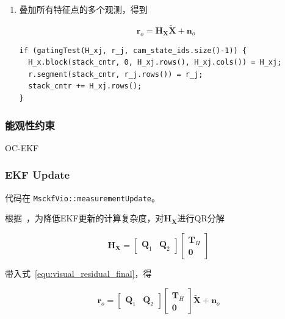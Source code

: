\documentclass[12pt,a4paper]{article}
\begin{document}
\begin{enumerate}
\item 叠加所有特征点的多个观测，得到

\begin{equation}
\label{equ:visual_residual_final}
\mathbf{r}_{o}=\mathbf{H}_{\mathbf{X}} \widetilde{\mathbf{X}}+\mathbf{n}_{o}
\end{equation}

\begin{lstlisting}
if (gatingTest(H_xj, r_j, cam_state_ids.size()-1)) {
  H_x.block(stack_cntr, 0, H_xj.rows(), H_xj.cols()) = H_xj;
  r.segment(stack_cntr, r_j.rows()) = r_j;
  stack_cntr += H_xj.rows();
}
\end{lstlisting}

\end{enumerate}


\subsubsection{能观性约束}

OC-EKF


\subsubsection{EKF Update}

代码在 \verb|MsckfVio::measurementUpdate|。

根据~\cite{mourikis2007multi}，为降低EKF更新的计算复杂度，对$\mathbf{H}_{\mathbf{X}}$进行QR分解

\begin{equation}
\mathbf{H}_{\mathbf{X}}=\left[\begin{array}{ll}{\mathbf{Q}_{1}} & {\mathbf{Q}_{2}}\end{array}\right]\left[\begin{array}{c}{\mathbf{T}_{H}} \\ {\mathbf{0}}\end{array}\right]
\end{equation}

带入式~\eqref{equ:visual_residual_final}，得

\begin{equation}
\mathbf{r}_{o}=\left[\begin{array}{ll}{\mathbf{Q}_{1}} & {\mathbf{Q}_{2}}\end{array}\right]\left[\begin{array}{c}{\mathbf{T}_{H}} \\ {\mathbf{0}}\end{array}\right] \tilde{\mathbf{X}}+\mathbf{n}_{o}
\end{equation}
\end{document}

